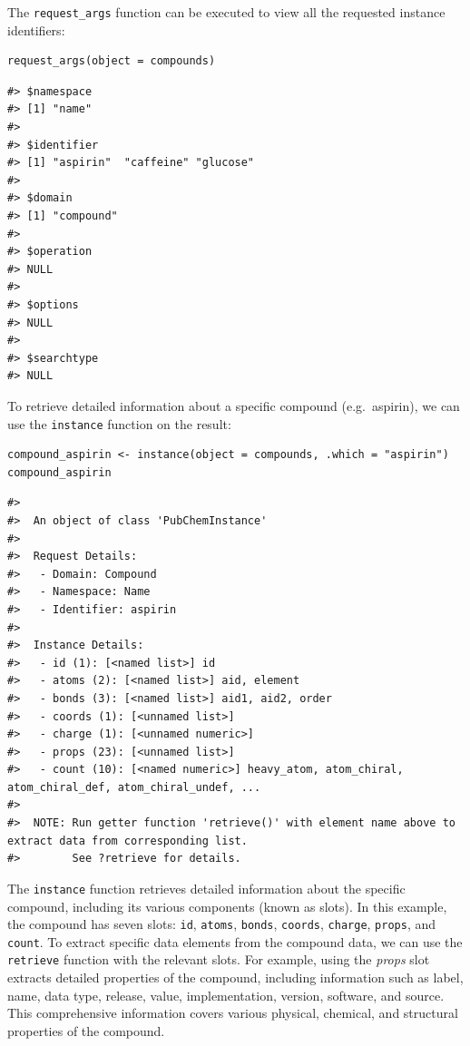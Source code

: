 The \texttt{request\_args} function can be executed to view all the requested instance identifiers:

\begin{verbatim}
request_args(object = compounds)
\end{verbatim}

\begin{verbatim}
#> $namespace
#> [1] "name"
#> 
#> $identifier
#> [1] "aspirin"  "caffeine" "glucose" 
#> 
#> $domain
#> [1] "compound"
#> 
#> $operation
#> NULL
#> 
#> $options
#> NULL
#> 
#> $searchtype
#> NULL
\end{verbatim}

To retrieve detailed information about a specific compound (e.g.~aspirin), we can use the \texttt{instance} function on the result:

\begin{verbatim}
compound_aspirin <- instance(object = compounds, .which = "aspirin")
compound_aspirin
\end{verbatim}

\begin{verbatim}
#> 
#>  An object of class 'PubChemInstance'
#> 
#>  Request Details:  
#>   - Domain: Compound
#>   - Namespace: Name
#>   - Identifier: aspirin
#> 
#>  Instance Details:  
#>   - id (1): [<named list>] id
#>   - atoms (2): [<named list>] aid, element
#>   - bonds (3): [<named list>] aid1, aid2, order
#>   - coords (1): [<unnamed list>] 
#>   - charge (1): [<unnamed numeric>] 
#>   - props (23): [<unnamed list>] 
#>   - count (10): [<named numeric>] heavy_atom, atom_chiral, atom_chiral_def, atom_chiral_undef, ...
#> 
#>  NOTE: Run getter function 'retrieve()' with element name above to extract data from corresponding list. 
#>        See ?retrieve for details.
\end{verbatim}

The \texttt{instance} function retrieves detailed information about the specific compound, including its various components (known as slots). In this example, the compound has seven slots: \texttt{id}, \texttt{atoms}, \texttt{bonds}, \texttt{coords}, \texttt{charge}, \texttt{props}, and \texttt{count}. To extract specific data elements from the compound data, we can use the \texttt{retrieve} function with the relevant slots. For example, using the \emph{props} slot extracts detailed properties of the compound, including information such as label, name, data type, release, value, implementation, version, software, and source. This comprehensive information covers various physical, chemical, and structural properties of the compound.

